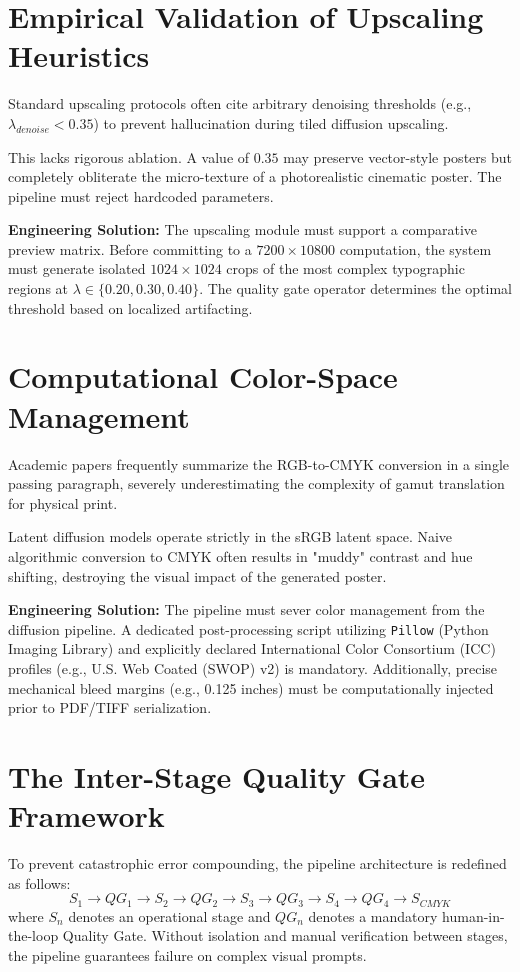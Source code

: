 \documentclass[10pt,journal,compsoc]{IEEEtran}
\begin{document}
\section{Empirical Validation of Upscaling Heuristics}
Standard upscaling protocols often cite arbitrary denoising thresholds (e.g., $\lambda_{denoise} < 0.35$) to prevent hallucination during tiled diffusion upscaling. 

This lacks rigorous ablation. A value of $0.35$ may preserve vector-style posters but completely obliterate the micro-texture of a photorealistic cinematic poster. The pipeline must reject hardcoded parameters.

\textbf{Engineering Solution:} The upscaling module must support a comparative preview matrix. Before committing to a $7200 \times 10800$ computation, the system must generate isolated $1024 \times 1024$ crops of the most complex typographic regions at $\lambda \in \{0.20, 0.30, 0.40\}$. The quality gate operator determines the optimal threshold based on localized artifacting.

\section{Computational Color-Space Management}
Academic papers frequently summarize the RGB-to-CMYK conversion in a single passing paragraph, severely underestimating the complexity of gamut translation for physical print.

Latent diffusion models operate strictly in the sRGB latent space. Naive algorithmic conversion to CMYK often results in "muddy" contrast and hue shifting, destroying the visual impact of the generated poster.

\textbf{Engineering Solution:} The pipeline must sever color management from the diffusion pipeline. A dedicated post-processing script utilizing \texttt{Pillow} (Python Imaging Library) and explicitly declared International Color Consortium (ICC) profiles (e.g., U.S. Web Coated (SWOP) v2) is mandatory. Additionally, precise mechanical bleed margins (e.g., 0.125 inches) must be computationally injected prior to PDF/TIFF serialization.

\section{The Inter-Stage Quality Gate Framework}
To prevent catastrophic error compounding, the pipeline architecture is redefined as follows:
\[ S_1 \to QG_1 \to S_2 \to QG_2 \to S_3 \to QG_3 \to S_4 \to QG_4 \to S_{CMYK} \]
where $S_n$ denotes an operational stage and $QG_n$ denotes a mandatory human-in-the-loop Quality Gate. Without isolation and manual verification between stages, the pipeline guarantees failure on complex visual prompts.
\end{document}

